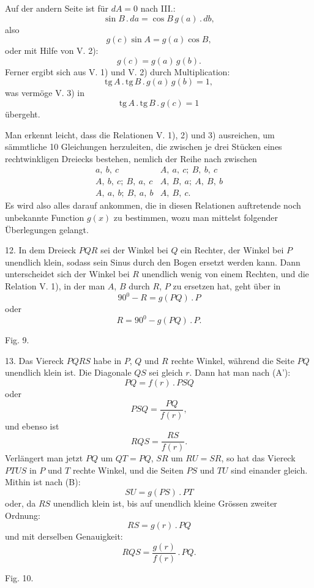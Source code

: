 %
\noindent Auf der andern Seite ist für $dA = 0$ nach III.:
\[
\sin B \,.\, da = \cos B\, g(a) \,.\, db,
\]
also
\[
g(c) \sin A = g(a) \cos B,
\]
oder mit Hilfe von V. 2):
\[
\tag*{V. 3)} g(c) = g(a)\, g(b).
\]
Ferner ergibt sich aus V. 1) und V. 2) durch Multiplication:
\[
\mathrm{tg}\, A \,.\, \mathrm{tg}\, B \,.\, g(a)\, g(b) = 1,
\]
was vermöge V. 3) in
\[
\tag*{V. 4)} \mathrm{tg}\, A \,.\, \mathrm{tg}\, B \,.\, g(c) = 1
\]
übergeht.

Man erkennt leicht, dass die Relationen V. 1), 2) und 3) ausreichen, um sämmtliche
10 Gleichungen herzuleiten, die zwischen je drei Stücken eines rechtwinkligen
Dreiecks bestehen, nemlich der Reihe nach zwischen
\[
\begin{array}{ll}
a,\ b,\ c & A,\ a,\ c;\ B,\ b,\ c\\
A,\ b,\ c;\ B,\ a,\ c & A,\ B,\ a;\ A,\ B,\ b\\
A,\ a,\ b;\ B,\ a,\ b & A,\ B,\ c.
\end{array}
\]
Es wird also alles darauf ankommen, die in diesen Relationen auftretende noch
unbekannte Function $g(x)$ zu bestimmen, wozu man mittelst folgender Überlegungen
gelangt.

12. In dem Dreieck $PQR$ sei der Winkel bei $Q$ ein Rechter, der Winkel bei $P$
unendlich klein, sodass sein Sinus durch den Bogen ersetzt werden kann. Dann
unterscheidet sich der Winkel bei $R$ unendlich wenig von einem Rechten, und die
Relation V. 1), in der man $A$, $B$ durch $R$, $P$ zu ersetzen hat, geht über in
\[
90^{0} - R = g(PQ) \,.\, P
\]
oder
\[
\tag*{(C)} R = 90^{0} - g(PQ) \,.\, P.
\]

\begin{center}\begin{minipage}{\linewidth}\centering


Fig. 9.
\end{minipage}\end{center}

13. Das Viereck $PQRS$ habe in $P$, $Q$ und $R$ rechte Winkel, während die Seite
$PQ$ unendlich klein ist. Die Diagonale $QS$ sei gleich $r$. Dann hat man nach
(A'):
\[
PQ = f(r) \,.\, PSQ
\]
oder
\[
PSQ = \frac{PQ}{f(r)},
\]
und ebenso ist
\[
RQS = \frac{RS}{f(r)}.
\]
Verlängert man jetzt $PQ$ um $QT = PQ$, $SR$ um $RU = SR$, so hat das Viereck
$PTUS$ in $P$ und $T$ rechte Winkel, und die Seiten $PS$ und $TU$ sind einander
gleich. Mithin ist nach (B):
\[
SU = g(PS) \,.\, PT
\]
oder, da $RS$ unendlich klein ist, bis auf unendlich kleine Grössen zweiter
Ordnung:
\[
RS = g(r) \,.\, PQ
\]
und mit derselben Genauigkeit:
\[
\tag*{7)} RQS = \frac{g(r)}{f(r)} \,.\, PQ.
\]

\begin{center}\begin{minipage}{\linewidth}\centering


Fig. 10.
\end{minipage}\end{center}
